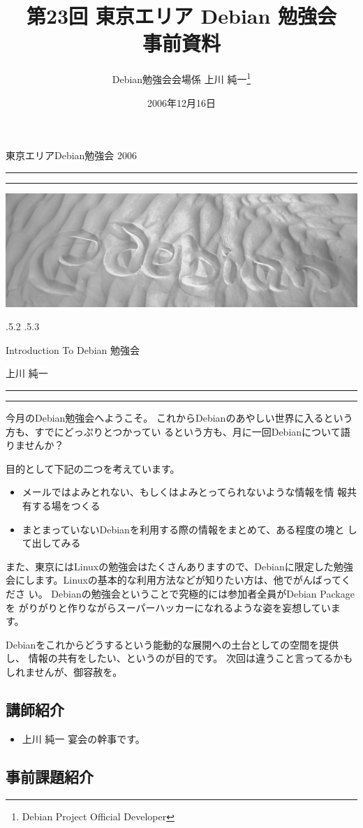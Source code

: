 \documentclass[mingoth,a4paper]{jsarticle}
\makeatletter
\renewcommand{\section}{\@startsection{section}{1}{\z@}%
    {\Cvs \@plus.5\Cdp \@minus.2\Cdp}%
    {.5\Cvs \@plus.3\Cdp}%
    {\normalfont\Huge\headfont\raggedright\centering}} %
\newcommand{\dancersection}[2]{%
\newpage
東京エリアDebian勉強会 2006
\hrule
\vspace{0.5mm}
\hrule
\hfill{}\includegraphics[width=16cm]{image2006-natsu/guruguru-sand-light.png}\\
\vspace{-5cm}
\begin{center}
\section{#1}
\end{center}
\hfill{}\colorbox{white}{#2}\hspace{3cm}\space\\
\vspace{1cm}
\hrule
\vspace{0.5mm}
\hrule
\vspace{1cm}
}
\makeatother
\begin{document}
\begin{titlepage}

\title{
 第23回 東京エリア Debian 勉強会\\事前資料}
\date{2006年12月16日}
\author{Debian勉強会会場係 上川 純一\thanks{Debian Project Official Developer}} 
\maketitle
\thispagestyle{empty}
\end{titlepage}

\newpage
\tableofcontents

\dancersection{Introduction To Debian 勉強会}{上川 純一}

今月のDebian勉強会へようこそ。
これからDebianのあやしい世界に入るという方も、すでにどっぷりとつかってい
るという方も、月に一回Debianについて語りませんか？

目的として下記の二つを考えています。

\begin{itemize}
 \item メールではよみとれない、もしくはよみとってられないような情報を情
       報共有する場をつくる
 \item まとまっていないDebianを利用する際の情報をまとめて、ある程度の塊と
       して出してみる
\end{itemize}

また、東京にはLinuxの勉強会はたくさんありますので、Debianに限定した勉強
会にします。Linuxの基本的な利用方法などが知りたい方は、他でがんばってくださ
い。
Debianの勉強会ということで究極的には参加者全員がDebian Packageを
がりがりと作りながらスーパーハッカーになれるような姿を妄想しています。

Debianをこれからどうするという能動的な展開への土台としての空間を提供し、
情報の共有をしたい、というのが目的です。
次回は違うこと言ってるかもしれませんが、御容赦を。

\subsection{講師紹介}

\begin{itemize}
 \item{上川 純一} 宴会の幹事です。
\end{itemize}

\subsection{事前課題紹介}
\end{document}
